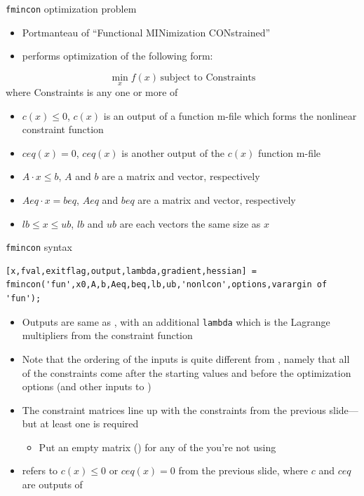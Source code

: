 \documentclass[english,xcolor=dvipsnames]{beamer}
\begin{document}
\begin{frame}[fragile]{\texttt{fmincon} optimization problem}
\begin{itemize}
	\item Portmanteau of ``Functional MINimization CONstrained''
	\item {} performs optimization of the following form:
\end{itemize}
\begin{equation*}
\min_{x} f(x) \, \textrm{subject to Constraints}
\end{equation*}
where Constraints is any one or more of
\begin{itemize}
	\item $c(x)\leq0$, \quad $c(x)$ is an output of a function m-file which forms the nonlinear constraint function
	\item $ceq(x)=0$, \quad $ceq(x)$ is another output of the $c(x)$ function m-file
	\item $A\cdot x\leq b$, \quad $A$ and $b$ are a matrix and vector, respectively
	\item $Aeq\cdot x= beq$, \quad $Aeq$ and $beq$ are a matrix and vector, respectively
	\item $lb\leq x \leq ub$, \quad $lb$ and $ub$ are each vectors the same size as $x$
\end{itemize}
\end{frame}

\begin{frame}[fragile]{\texttt{fmincon} syntax}
\begin{lstlisting}
[x,fval,exitflag,output,lambda,gradient,hessian] = fmincon('fun',x0,A,b,Aeq,beq,lb,ub,'nonlcon',options,varargin of 'fun');
\end{lstlisting}
\begin{itemize}
	\item Outputs are same as , with an additional \texttt{lambda} which is the Lagrange multipliers from the constraint function
	\item Note that the ordering of the inputs is quite different from , namely that all of the constraints come after the starting values and before the optimization options (and other inputs to )
	\item The constraint matrices  line up with the constraints from the previous slide---but at least one is required
	\begin{itemize}
		\item Put an empty matrix (\mcode{[]}) for any of the  you're not using
	\end{itemize}
	\item {} refers to $c(x)\leq0$ or $ceq(x)=0$ from the previous slide, where $c$ and $ceq$ are outputs of 
\end{itemize}
\end{frame}
\end{document}
